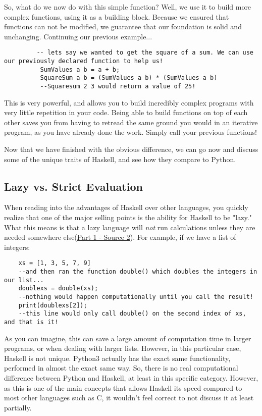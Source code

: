 \documentclass{article}
\begin{document}
    \medskip\noindent So, what do we now do with this simple function? Well, we use it to build more complex functions, using it as a building block. Because we ensured that functions can not be modified, we guarantee that our foundation is solid and unchanging. Continuing our previous example...
        \begin{lstlisting}
         -- lets say we wanted to get the square of a sum. We can use our previously declared function to help us! 
          SumValues a b = a + b;
          SquareSum a b = (SumValues a b) * (SumValues a b)
          --Squaresum 2 3 would return a value of 25!
        \end{lstlisting}
     \medskip\noindent This is very powerful, and allows you to build incredibly complex programs with very little repetition in your code. Being able to build functions on top of each other saves you from having to retread the same ground you would in an iterative program, as you have already done the work. Simply call your previous functions!
    
    \medskip
     \medskip\noindent Now that we have finished with the obvious difference, we can go now and discuss some of the unique traits of Haskell, and see how they compare to Python. 
     
    \subsection{Lazy vs. Strict Evaluation}
    When reading into the advantages of Haskell over other languages, you quickly realize that one of the major selling points is the ability for Haskell to be "lazy." What this means is that a lazy language will \textit{not} run calculations unless they are needed somewhere else(\href {https://towardsdatascience.com/what-is-lazy-evaluation-in-python-9efb1d3bfed0}{Part 1 - Source 2}). For example, if we have a list of integers: 

    \begin{lstlisting}
    xs = [1, 3, 5, 7, 9]
    --and then ran the function double() which doubles the integers in our list...
    doublexs = double(xs);
    --nothing would happen computationally until you call the result!
    print(doublexs[2]);
    --this line would only call double() on the second index of xs, and that is it! 
    \end{lstlisting}

    \medskip\noindent As you can imagine, this can save a large amount of computation time in larger programs, or when dealing with larger lists. However, in this particular case, Haskell is not unique. Python3 actually has the exact same functionality, performed in almost the exact same way. So, there is no real computational difference between Python and Haskell, at least in this specific category. However, as this is one of the main concepts that allows Haskell its speed compared to most other languages such as C, it wouldn't feel correct to not discuss it at least partially. 
\end{document}

